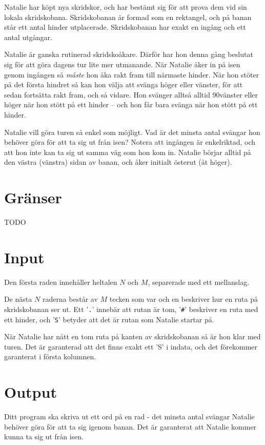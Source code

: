 Natalie har köpt nya skridskor, och har bestämt sig för att prova dem vid sin
lokala skridskobana. Skridskobanan är formad som en rektangel, och på banan
står ett antal hinder utplacerade. Skridskobanan har exakt en ingång och ett antal
utgångar.

Natalie är ganska rutinerad skridskoåkare. Därför har hon denna gång beslutat
sig för att göra dagens tur lite mer utmanande. När Natalie åker in på isen
genom ingången så \emph{måste} hon åka rakt fram till närmaste hinder. När hon
stöter på det första hindret så kan hon välja att svänga höger eller vänster,
för att sedan fortsätta rakt fram, och så vidare. Hon svänger alltså alltid
90\deg vänster eller höger när hon stött på ett hinder -- och hon får bara svänga
när hon stött på ett hinder.

Natalie vill göra turen så enkel som möjligt. Vad är det minsta antal svängar
hon behöver göra för att ta sig ut från isen? Notera att ingången är enkelriktad,
och att hon inte kan ta sig ut samma väg som hon kom in. Natalie börjar alltid
på den västra (vänstra) sidan av banan, och åker initialt österut (åt höger).

\section*{Gränser}
TODO

\section*{Input}
Den första raden innehåller heltalen $N$ och $M$, separerade med ett mellanslag.

De nästa $N$ raderna består av $M$ tecken som var och en beskriver hur en ruta
på skridskobanan ser ut. Ett '\texttt{.}' innebär att rutan är tom,
'\texttt{\#}' beskriver en ruta med ett hinder, och '\texttt{S}' betyder att det är
rutan som Natalie startar på.

När Natalie har nått en tom ruta på kanten av skridskobanan så är hon klar med
turen. Det är garanterad att det finns exakt ett 'S' i indata, och det förekommer
garanterat i första kolumnen.

\section*{Output}
Ditt program ska skriva ut ett ord på en rad - det minsta antal svängar Natalie
behöver göra för att ta sig igenom banan. Det är garanterat att Natalie kommer kunna
ta sig ut från isen.

